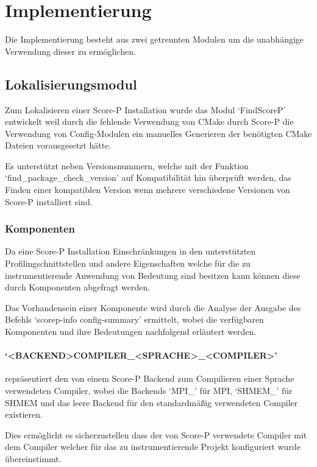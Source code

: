 \documentclass[german,proseminar,hyperref,utf8]{zihpub}
\begin{document}
    \newpage
    \section{Implementierung}
    Die Implementierung besteht aus zwei getrennten Modulen um die unabhängige Verwendung dieser
    zu ermöglichen.

    \subsection{Lokalisierungsmodul}
    Zum Lokalisieren einer Score-P Installation wurde das Modul `FindScoreP' entwickelt weil
    durch die fehlende Verwendung von CMake durch Score-P die Verwendung von Config-Modulen
    ein manuelles Generieren der benötigten CMake Dateien vorausgesetzt hätte.

    Es unterstützt neben Versionsnummern, welche mit der Funktion `find\_package\_check\_version'
    auf Kompatibilität hin überprüft werden, das Finden einer kompatiblen Version wenn
    mehrere verschiedene Versionen von Score-P installiert sind.

    \subsubsection{Komponenten}
    Da eine Score-P Installation Einschränkungen in den unterstützten Profilingschnittstellen und
    andere Eigenschaften welche für die zu instrumentierende Anwendung von Bedeutung sind besitzen
    kann können diese durch Komponenten abgefragt werden.

    Das Vorhandensein einer Komponente wird durch die Analyse der Ausgabe des Befehls
    `scorep-info config-summary' ermittelt, wobei die verfügbaren Komponenten und ihre
    Bedeutungen nachfolgend erläutert werden.

    \paragraph{`<BACKEND>COMPILER\_<SPRACHE>\_<COMPILER>'} repräsentiert den von einem Score-P Backend
    zum Compilieren einer Sprache verwendeten Compiler, wobei die Backends `MPI\_' für MPI,
    `SHMEM\_' für SHMEM und das leere Backend für den standardmä{\ss}ig verwendeten Compiler existieren.

    Dies ermöglicht es sicherzustellen dass der von Score-P verwendete Compiler mit dem Compiler
    welcher für das zu instrumentierende Projekt konfiguriert wurde übereinstimmt.
\end{document}
